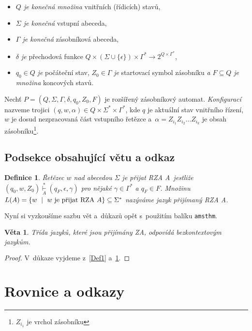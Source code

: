 \documentclass[a4paper, 11pt, twocolumn]{article}
\newtheorem{definition}{Definice}
\newtheorem{sentence}{Věta}
\begin{document}
\begin{itemize}
\item \textit{$Q$ je konečná množina} vnitřních (řídicích) stavů,
\item \textit{$\Sigma$ je konečná} vstupní abeceda,
\item \textit{$\Gamma$ je konečná} zásobníková abeceda,
\item \textit{$\delta$ je} přechodová funkce $Q\times(\Sigma\cup\{\epsilon\})\times\Gamma^{*}\rightarrow2^{Q\times\Gamma^{*}}$,
\item $q_0 \in Q$ \textit{je} počáteční stav, $Z_0 \in \Gamma$ \textit{je} startovací symbol zásobníku \textit{a $F \subseteq Q$ je množina} koncových stavů.
\end{itemize}

Nechť $P = (Q, \Sigma, \Gamma, \delta, q_0, Z_0, F)$ je rozšířený zásobníkový automat. \textit{Konfigurací} nazveme trojici $(q, w, \alpha) \in Q\times\Sigma^{*}\times\Gamma^{*}$, kde $q$ je aktuální stav vnitřního řízení, $w$ je dosud nezpracovaná část vstupního řetězce a~$\alpha = Z_{i_1}Z_{i_2}\ldots Z_{i_k}$ je obsah zásobníku\footnote{$Z_{i_1}$ je vrchol zásobníku}.

\subsection{Podsekce obsahující větu a odkaz}

\begin{definition}\label{Def2}
\textnormal{Řetězec $w$ nad abecedou $\Sigma$ je přijat RZA} A~jestliže $(q_0, w, Z_0)\underset{A}{\overset{*}{\vdash}}(q_F, \epsilon, \gamma)$ pro nějaké $\gamma \in \Gamma^{*}$ a $q_F \in F$. Množinu $L(A) = \{w \ \mid \ w \textup{ je přijat RZA }A \}\subseteq \Sigma^{*}$ nazýváme \textnormal{jazyk přijímaný RZA} A.
\end{definition}

Nyní si vyzkoušíme sazbu vět a~důkazů opět s~použitím balíku \texttt{amsthm}.

\begin{sentence}
Třída jazyků, které jsou přijímány ZA, odpovídá \textnormal{bezkontextovým jazykům}.
\end{sentence}

\begin{proof}
\textnormal{V~důkaze vyjdeme z~\ref{Def1} a~\ref{Def2}.}
\end{proof}

\section{Rovnice a odkazy}
\end{document}
